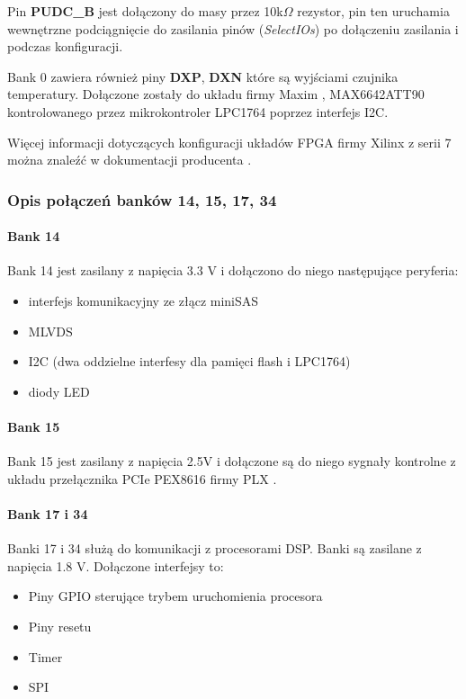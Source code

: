 Pin \textbf{PUDC\_B} jest dołączony do masy przez 10k$\Omega$ rezystor, pin ten uruchamia wewnętrzne podciągnięcie do zasilania pinów (\textit{SelectIOs}) po dołączeniu zasilania i podczas konfiguracji.

Bank 0 zawiera również piny \textbf{DXP}, \textbf{DXN} które są wyjściami czujnika temperatury. Dołączone zostały do układu firmy Maxim \cite{COMPANY:MAXIM}, MAX6642ATT90 \cite{MAX6642ATT90} kontrolowanego przez mikrokontroler LPC1764 poprzez interfejs I2C.

Więcej informacji dotyczących konfiguracji układów FPGA firmy Xilinx z serii 7 można znaleźć w dokumentacji producenta \cite{FPGA:UG470}.

\subsubsection{Opis połączeń banków 14, 15, 17, 34}

 \paragraph{Bank 14}
Bank 14 jest zasilany z napięcia 3.3 V i dołączono do niego następujące peryferia:
\begin{itemize}
\item
interfejs komunikacyjny ze złącz miniSAS
\item
MLVDS
\item
I2C (dwa oddzielne interfesy dla pamięci flash i LPC1764)
\item
diody LED
\end{itemize}

 \paragraph{Bank 15}
Bank 15 jest zasilany z napięcia 2.5V i dołączone są do niego sygnały kontrolne z układu przełącznika PCIe PEX8616  \cite{PEX8616} firmy PLX \cite{COMPANY:PLX}. 

 \paragraph{Bank 17 i 34}
Banki 17 i 34 służą do komunikacji z procesorami DSP. Banki są zasilane z napięcia 1.8 V. Dołączone interfejsy to:
 \begin{itemize}
\item
Piny GPIO sterujące trybem uruchomienia procesora
\item
Piny resetu
\item
Timer
\item
SPI
\end{itemize}

